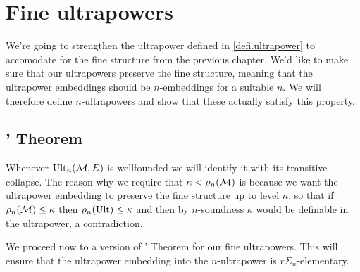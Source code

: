 \chapter{Fine ultrapowers}
\thispagestyle{fancy}
\label{ch3}

We're going to strengthen the ultrapower defined in \ref{defi.ultrapower} to accomodate for the fine structure from the previous chapter. We'd like to make sure that our ultrapowers preserve the fine structure, meaning that the ultrapower embeddings should be $n$-embeddings for a suitable $n$. We will therefore define $n$-ultrapowers and show that these actually satisfy this property.


\section{\los' Theorem}


Whenever $\operatorname{Ult}_n(\operatorname{\mathcal{M}},E)$ is wellfounded we will identify it with its transitive collapse. The reason why we require that $\kappa<\rho_n(\operatorname{\mathcal{M}})$ is because we want the ultrapower embedding to preserve the fine structure up to level $n$, so that if $\rho_n(\operatorname{\mathcal{M}})\leq\kappa$ then $\rho_n(\operatorname{Ult})\leq\kappa$ and then by $n$-soundness $\kappa$ would be definable in the ultrapower, a contradiction.

\qquad We proceed now to a version of \los' Theorem for our fine ultrapowers. This will ensure that the ultrapower embedding into the $n$-ultrapower is $r\Sigma_n$-elementary.

